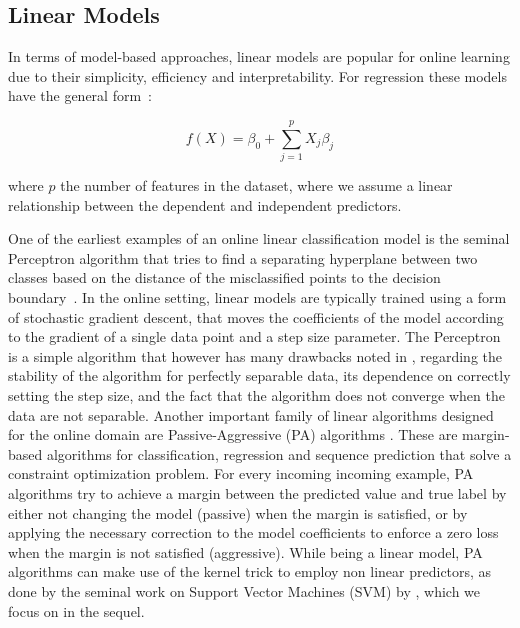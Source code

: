 \subsection*{Linear Models}
In terms of model-based approaches, linear models are popular
for online learning due to their simplicity, efficiency and interpretability.
For regression these models have the general form~\cite{esl}:

\begin{equation}
	f(X) = \beta_0 + \sum_{j=1}^{p}{X_j\beta_j}
\end{equation}

\noindent
where $p$ the number of features in the dataset, where we assume a linear relationship between the dependent and independent predictors.

One of the earliest examples of an online linear classification model is the seminal
Perceptron algorithm \cite{perceptron} that tries to find a separating hyperplane
between two classes based on the distance of the misclassified points to the
decision boundary~\cite{esl}.
In the online setting, linear models are typically trained using a form
of stochastic gradient descent, that moves the coefficients
of the model according to the gradient of a single data point
and a step size parameter.
The Perceptron is a simple algorithm that however has many drawbacks
noted in \cite{esl}, regarding the stability of the algorithm
for perfectly separable data, its dependence on correctly setting
the step size, and the fact that the algorithm does not
converge when the data are not separable.
Another important family of linear algorithms designed for the online domain
are Passive-Aggressive (PA) algorithms \cite{passive-aggressive}.
These are margin-based algorithms for classification, regression and
sequence prediction that solve a constraint optimization problem.
For every incoming incoming example, PA algorithms
try to achieve a margin between the predicted value and true label
by either not changing the model (passive) when the margin is satisfied,
or by applying the necessary correction to the model coefficients
to enforce a zero loss when the margin is not satisfied (aggressive).
While being a linear model, PA algorithms can make use of the kernel trick to
employ non linear predictors, as done by the seminal work
on Support Vector Machines (SVM) by \citet{svm-book}, which we
focus on in the sequel.

